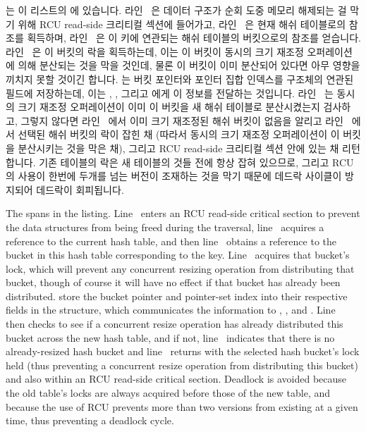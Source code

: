 \fi

\begin{fcvref}
 는 이 리스트의  에 있습니다.
라인~ 은 데이터 구조가 순회 도중 메모리 해제되는 걸 막기 위해
RCU read-side 크리티컬 섹션에 들어가고, 라인~ 은 현재 해쉬
테이블로의 참조를 획득하며, 라인~ 은 이 키에 연관되는 해쉬
테이블의 버킷으로의 참조를 얻습니다.
라인~ 은 이 버킷의 락을 획득하는데, 이는 이 버킷이 동시의
크기 재조정 오퍼레이션에 의해 분산되는 것을 막을 것인데, 물론 이 버킷이 이미
분산되어 있다면 아무 영향을 끼치지 못할 것이긴 합니다.
 는 버킷 포인터와 포인터 집합 인덱스를
 구조체의 연관된 필드에 저장하는데, 이는 ,
, 그리고  에게 이 정보를 전달하는
것입니다.
라인~ 는 동시의 크기 재조정 오퍼레이션이 이미 이 버킷을 새
해쉬 테이블로 분산시켰는지 검사하고, 그렇지 않다면 라인~ 에서
이미 크기 재조정된 해쉬 버킷이 없음을 알리고 라인~ 에서 선택된
해쉬 버킷의 락이 잡힌 채 (따라서 동시의 크기 재조정 오퍼레이션이 이 버킷을
분산시키는 것을 막은 채), 그리고 RCU read-side 크리티컬 섹션 안에 있는 채
리턴합니다.
기존 테이블의 락은 새 테이블의 것들 전에 항상 잡혀 있으므로, 그리고 RCU 의
사용이 한번에 두개를 넘는 버전이 조재하는 것을 막기 때문에 데드락 사이클이
방지되어 데드락이 회피됩니다.

\iffalse

\begin{fcvref}
The  spans
 in the listing.
Line~ enters an RCU read-side critical section to prevent
the data structures from being freed during the traversal,
line~ acquires a reference to the current hash table, and then
line~ obtains a reference to the bucket in this hash table
corresponding to the key.
Line~ acquires that bucket's lock, which will prevent any concurrent
resizing operation from distributing that bucket, though of course it
will have no effect if that bucket has already been distributed.
 store the bucket pointer and
pointer-set index into their respective fields in the
 structure, which communicates the information to
, , and .
Line~ then checks to see if a concurrent resize
operation has already distributed this bucket across the new hash table,
and if not, line~ indicates that there is no
already-resized hash bucket and
line~ returns with the selected hash bucket's
lock held (thus preventing a concurrent resize operation from distributing
this bucket) and also within an RCU read-side critical section.
Deadlock is avoided because the old table's locks are always acquired
before those of the new table, and because the use of RCU prevents more
than two versions from existing at a given time, thus preventing a
deadlock cycle.


\end{fcvref}
\end{fcvref}
